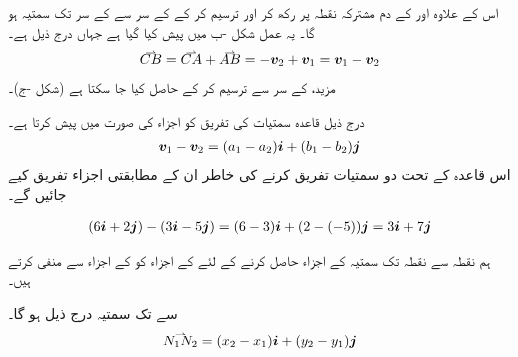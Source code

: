 اس کے علاوہ   اور  کے دم مشترکہ  نقطہ پر رکھ  کر  اور  ترسیم کر کے  کے سر سے  کے سر تک سمتیہ  ہو گا۔ یہ عمل  شکل -ب میں پیش  کیا گیا ہے جہاں درج ذیل ہے۔
 \begin{align*}
\krightharpoonup{CB}=\krightharpoonup{CA}+\krightharpoonup{AB}=-\kvec{v}_2+\kvec{v}_1=\kvec{v}_1-\kvec{v}_2
\end{align*}
مزید،  کے سر سے  ترسیم کر کے  حاصل کیا جا سکتا ہے (شکل -ج)۔

درج ذیل قاعدہ سمتیات کی تفریق کو اجزاء کی صورت میں پیش کرتا ہے۔
\begin{align}
{\ensuremath{{\boldsymbol{v}}}}_1-{{\boldsymbol{v}}}_2=(a_1-a_2){\boldsymbol{i}}+(b_1-b_2){\boldsymbol{j}}
\end{align}
اس قاعدہ کے تحت دو سمتیات تفریق کرنے کی خاطر ان کے مطابقتی اجزاء تفریق کیے جائیں گے۔

\begin{align*}
(6{\boldsymbol{i}}+2{\boldsymbol{j}})-(3{\boldsymbol{i}}-5{\boldsymbol{j}})=(6-3){\boldsymbol{i}}+(2-(-5)){\boldsymbol{j}}=3{\boldsymbol{i}}+7{\boldsymbol{j}}
\end{align*}

ہم نقطہ  سے نقطہ  تک سمتیہ کے اجزاء حاصل کرنے کے لئے  کے اجزاء کو  کے اجزاء سے منفی کرتے ہیں۔

 سے  تک سمتیہ درج ذیل ہو گا۔
\begin{align}
\krightharpoonup{N_1N_2}=(x_2-x_1)\ai+(y_2-y_1)\aj
\end{align}

